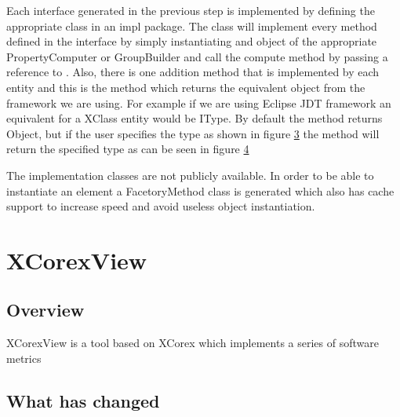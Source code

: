 \begin{figure}
\centering
\scalebox{0.5}{\texttt{[image: ]}}
\label{fig:xCorexCodeExample}
\end{figure}

\begin{figure}
\centering
\scalebox{0.5}{\texttt{[image: ]}}
\label{fig:xCorexRunExample}
\end{figure}
	
	Each interface generated in the previous step is implemented by defining the
appropriate class in an impl package. The class will implement every method
defined in the interface by simply instantiating and object of the appropriate
PropertyComputer or GroupBuilder and call the compute method by passing a
reference to . Also, there is one addition method that is implemented 
by each entity and this is the  method which returns
the equivalent object from the framework we are using. For example if we are
using Eclipse JDT framework an equivalent for a XClass entity would be IType.
By default the method returns Object, but if the user specifies the type as
shown in figure \ref{fig:xCorexTypeDialogBox} the method will return the
specified type as can be seen in figure \ref{fig:xCorexUnderlyingObject}

\begin{figure}
\centering
\scalebox{0.5}{\texttt{[image: ]}}
\label{fig:xCorexTypeDialogBox}
\end{figure}

	The implementation classes are not publicly available.
In order to be able to instantiate an element a FacetoryMethod class is
generated which also has cache support to increase speed and avoid useless
object instantiation.
	
	
\begin{figure}
\centering
\scalebox{0.5}{\texttt{[image: ]}}
\label{fig:xCorexUnderlyingObject}
\end{figure}
	
\begin{figure}
\centering
{}
\label{fig:xCorexError}
\end{figure}

\section {XCorexView}

\subsection {Overview}
	XCorexView is a tool based on XCorex which implements a series of  software
	metrics

\subsection {What has changed}

	